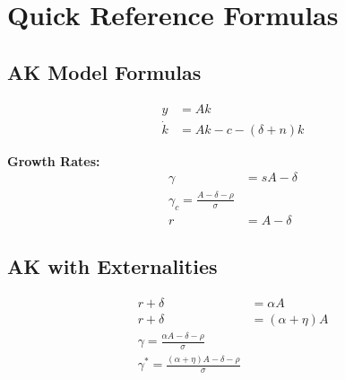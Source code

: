 
\section{Quick Reference Formulas}

\subsection{AK Model Formulas}

\begin{align*}
y &= Ak \tag{Production} \\
\dot{k} &= Ak - c - (\delta + n)k \tag{Law of Motion}
\end{align*}

\medskip
\noindent\textbf{Growth Rates:}
\begin{align*}
\gamma &= sA - \delta \tag{Exog. Savings} \\
\boxed{\gamma_c = \frac{A - \delta - \rho}{\sigma}} \tag{Ramsey} \\
r &= A - \delta \tag{Interest Rate}
\end{align*}

\subsection{AK with Externalities}

\begin{align*}
r + \delta &= \alpha A \tag{Private MPK} \\
r + \delta &= (\alpha + \eta)A \tag{Social MPK} \\
\boxed{\gamma = \frac{\alpha A - \delta - \rho}{\sigma}} \tag{Private Growth} \\
\boxed{\gamma^* = \frac{(\alpha + \eta)A - \delta - \rho}{\sigma}} \tag{Planner Growth}
\end{align*}

